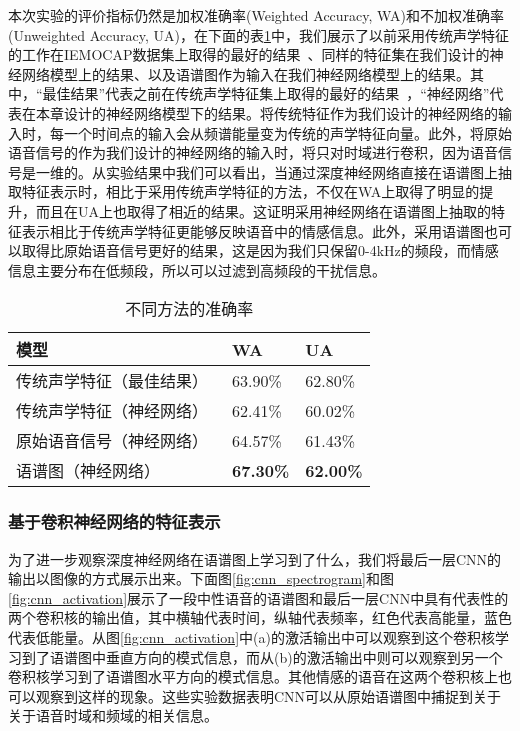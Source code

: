 本次实验的评价指标仍然是加权准确率(Weighted Accuracy, WA)和不加权准确率(Unweighted Accuracy, UA)，在下面的表\ref{tab:acc_end2end}中，我们展示了以前采用传统声学特征的工作在IEMOCAP数据集上取得的最好的结果~\cite{Lee2015High}、同样的特征集在我们设计的神经网络模型上的结果、以及语谱图作为输入在我们神经网络模型上的结果。其中，“最佳结果”代表之前在传统声学特征集上取得的最好的结果~\cite{Lee2015High}，“神经网络”代表在本章设计的神经网络模型下的结果。将传统特征作为我们设计的神经网络的输入时，每一个时间点的输入会从频谱能量变为传统的声学特征向量。此外，将原始语音信号的作为我们设计的神经网络的输入时，将只对时域进行卷积，因为语音信号是一维的。从实验结果中我们可以看出，当通过深度神经网络直接在语谱图上抽取特征表示时，相比于采用传统声学特征的方法，不仅在WA上取得了明显的提升，而且在UA上也取得了相近的结果。这证明采用神经网络在语谱图上抽取的特征表示相比于传统声学特征更能够反映语音中的情感信息。此外，采用语谱图也可以取得比原始语音信号更好的结果，这是因为我们只保留0-4kHz的频段，而情感信息主要分布在低频段，所以可以过滤到高频段的干扰信息。

\begin{table}[htb]
\centering
\begin{minipage}[t]{1.0\linewidth} %
\caption{不同方法的准确率}
\label{tab:acc_end2end}
    \begin{tabularx}{\linewidth}{X<{\centering} X<{\centering} X<{\centering}}
        \toprule[1.5pt]
        模型 & WA & UA \\
        \midrule[1pt]
        传统声学特征（最佳结果）~\cite{Lee2015High} & 63.90\% & 62.80\% \\
        传统声学特征（神经网络） & 62.41\% & 60.02\% \\
        原始语音信号（神经网络） & 64.57\% & 61.43\% \\
        语谱图（神经网络） & \textbf{67.30\%} & \textbf{62.00\%} \\
        \bottomrule[1.5pt]
    \end{tabularx}
\end{minipage}
\end{table}

\subsubsection{基于卷积神经网络的特征表示}
\label{sssec:end2end_cnn_feature}

为了进一步观察深度神经网络在语谱图上学习到了什么，我们将最后一层CNN的输出以图像的方式展示出来。下面图\ref{fig:cnn_spectrogram}和图\ref{fig:cnn_activation}展示了一段中性语音的语谱图和最后一层CNN中具有代表性的两个卷积核的输出值，其中横轴代表时间，纵轴代表频率，红色代表高能量，蓝色代表低能量。从图\ref{fig:cnn_activation}中(a)的激活输出中可以观察到这个卷积核学习到了语谱图中垂直方向的模式信息，而从(b)的激活输出中则可以观察到另一个卷积核学习到了语谱图水平方向的模式信息。其他情感的语音在这两个卷积核上也可以观察到这样的现象。这些实验数据表明CNN可以从原始语谱图中捕捉到关于关于语音时域和频域的相关信息。

